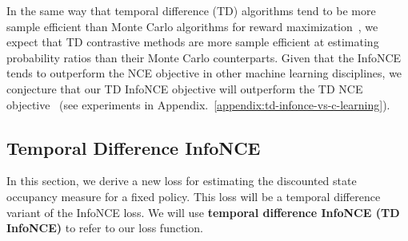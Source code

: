 \documentclass{article} %
\begin{document}
In the same way that temporal difference (TD) algorithms tend to be more sample efficient than Monte Carlo algorithms for reward maximization~\citep{sutton2018reinforcement}, we expect that TD contrastive methods are more sample efficient at estimating probability ratios than their Monte Carlo counterparts.
Given that the InfoNCE tends to outperform the NCE objective in other machine learning disciplines, we conjecture that our TD InfoNCE objective will outperform the TD NCE objective~\citep{eysenbach2020c} (see experiments in Appendix.~\ref{appendix:td-infonce-vs-c-learning}).












\subsection{Temporal Difference InfoNCE}
\label{subsec:td-infonce}

In this section, we derive a new loss for estimating the discounted state occupancy measure for a fixed policy. This loss will be a temporal difference variant of the InfoNCE loss. We will use \textbf{temporal difference InfoNCE (TD InfoNCE)} to refer to our loss function. %
\end{document}
